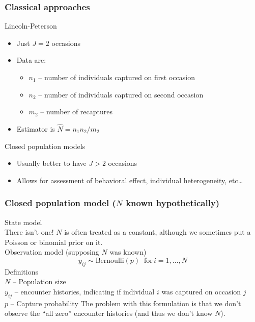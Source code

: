 \documentclass[color=usenames,dvipsnames]{beamer}\usepackage[]{graphicx}\usepackage[]{color}
\begin{document}
\begin{frame}
  \frametitle{Classical approaches}
  Lincoln-Peterson  \\
  \begin{itemize}
    \item Just $J=2$ occasions
    \item Data are:
      \begin{itemize}
        \item $n_1$ -- number of individuals captured on first occasion
        \item $n_2$ -- number of individuals captured on second occasion
        \item $m_2$ -- number of recaptures
      \end{itemize}
    \item Estimator is $\hat{N} = n_1n_2/m_2$  
  \end{itemize}
  \pause
  \vfill
  Closed population models \\
  \begin{itemize}
    \item Usually better to have $J>2$ occasions
    \item Allows for assessment of behavioral effect, individual heterogeneity, etc\dots
  \end{itemize}
\end{frame}






\begin{frame}
  \frametitle{\large Closed population model ($N$ known hypothetically) }
  \small
  State model \\
  \vspace{6pt}
  {\centering
    There isn't one! $N$ is often treated as a constant, although we
    sometimes put a Poisson or binomial prior on it.  \\
  }
  \pause
  \vfill
  Observation model (supposing $N$ was known)
  \begin{equation*}
    y_{ij} \sim \mathrm{Bernoulli}(p) \;\; \mathrm{for}\, i=1,\dots,N 
  \end{equation*}
  \pause
  \small
  Definitions \\
  $N$ -- Population size \\
  \hangindent=0.8cm $y_{ij}$ -- encounter histories, indicating if
  individual $i$ was captured on occasion $j$ \\  
  $p$ -- Capture probability
  \pause
  \vfill
  The problem with this formulation is that we don't observe the ``all
  zero'' encounter histories (and thus we don't know $N$). 
\end{frame}
\end{document}
